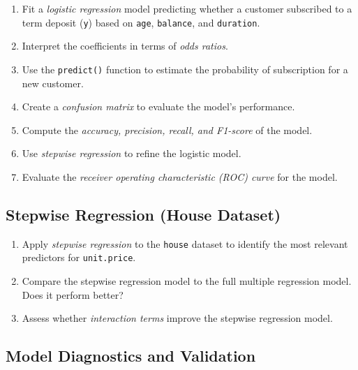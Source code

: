 \documentclass[
  11pt,
]{book}
\providecommand{\tightlist}{%
  \setlength{\itemsep}{0pt}\setlength{\parskip}{0pt}}
\theoremstyle{definition}
\theoremstyle{definition}
\theoremstyle{definition}
\theoremstyle{definition}
\theoremstyle{remark}
\begin{document}
\begin{enumerate}
\def\labelenumi{\arabic{enumi}.}
\setcounter{enumi}{39}
\tightlist
\item
  Fit a \emph{logistic regression} model predicting whether a customer subscribed to a term deposit (\texttt{y}) based on \texttt{age}, \texttt{balance}, and \texttt{duration}.\\
\item
  Interpret the coefficients in terms of \emph{odds ratios}.\\
\item
  Use the \texttt{predict()} function to estimate the probability of subscription for a new customer.\\
\item
  Create a \emph{confusion matrix} to evaluate the model's performance.\\
\item
  Compute the \emph{accuracy, precision, recall, and F1-score} of the model.\\
\item
  Use \emph{stepwise regression} to refine the logistic model.\\
\item
  Evaluate the \emph{receiver operating characteristic (ROC) curve} for the model.
\end{enumerate}

\subsection*{Stepwise Regression (House Dataset)}\label{stepwise-regression-house-dataset}


\begin{enumerate}
\def\labelenumi{\arabic{enumi}.}
\setcounter{enumi}{46}
\tightlist
\item
  Apply \emph{stepwise regression} to the \texttt{house} dataset to identify the most relevant predictors for \texttt{unit.price}.\\
\item
  Compare the stepwise regression model to the full multiple regression model. Does it perform better?\\
\item
  Assess whether \emph{interaction terms} improve the stepwise regression model.
\end{enumerate}

\subsection*{Model Diagnostics and Validation}\label{model-diagnostics-and-validation}
\end{document}
